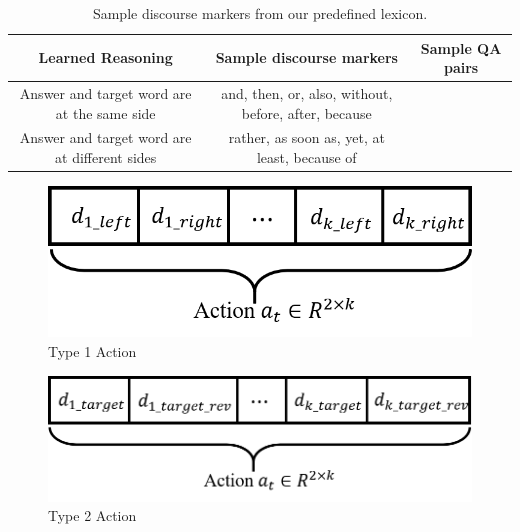 \begin{table}[t]
\centering
{
	\fontsize{9}{9}\selectfont
    \setlength{\tabcolsep}{1.0mm}
    \renewcommand{\arraystretch}{1.1}
	\begin{tabular}{|c|c|c|}
 	\hline
  	Learned Reasoning & {Sample discourse markers} & Sample QA pairs \\
  	\hline
 	Answer and target word are at the same side & and, then, or, also, without, before, after, because &  \\
    \hline
 	Answer and target word are at different sides & rather, as soon as, yet, at least, because of &\\
 	\hline
\end{tabular}
}
\caption{\fontsize{10}{12}\selectfont Sample discourse markers from our predefined lexicon.}
\label{tab:discourse_markers}
\end{table}


\begin{figure}
\begin{minipage}{.49\textwidth}
  \centering
  \includegraphics[width=0.9\linewidth]{fig/fig2.png}
  \caption{Type 1 Action}
  \label{fig:type1action}
\end{minipage}
\end{figure}
\begin{figure}
\begin{minipage}{.49\textwidth}
  \centering
  \includegraphics[width=0.9\linewidth]{fig/fig3.png}
  \caption{Type 2 Action}
  \label{fig:type2action}
\end{minipage}
\end{figure}

